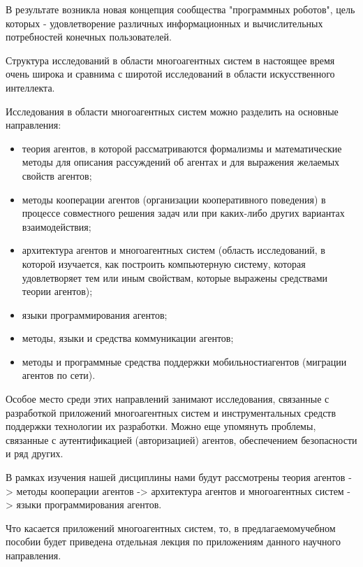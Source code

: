 В результате возникла новая концепция сообщества "программных роботов", цель которых - удовлетворение различных информационных и вычислительных потребностей конечных пользователей.

Структура исследований в области многоагентных систем в настоящее
время очень широка и сравнима с широтой исследований в области искусственного интеллекта.

Исследования в области многоагентных систем можно разделить на основные направления:

\begin{itemize}
  \item теория агентов, в которой рассматриваются формализмы и математические методы для описания рассуждений об агентах и для выражения желаемых свойств агентов;
  \item методы кооперации агентов (организации кооперативного поведения) в
процессе совместного решения задач или при каких-либо других вариантах
взаимодействия;
  \item архитектура агентов и многоагентных систем (область исследований,
в которой изучается, как построить компьютерную систему, которая удовлетворяет тем или иным свойствам, которые выражены средствами теории агентов);
  \item языки программирования агентов;
  \item методы, языки и средства коммуникации агентов;
  \item методы и программные средства поддержки мобильностиагентов
(миграции агентов по сети). 
\end{itemize}

Особое место среди этих направлений занимают исследования, связанные с разработкой приложений многоагентных систем и инструментальных
средств поддержки технологии их разработки. Можно еще упомянуть проблемы, связанные с аутентификацией (авторизацией) агентов, обеспечением
безопасности и ряд других.

В рамках изучения нашей дисциплины нами будут рассмотрены теория
агентов -> методы кооперации агентов -> архитектура агентов и многоагентных систем -> языки программирования агентов.

Что касается приложений многоагентных систем, то, в предлагаемомучебном пособии будет приведена отдельная лекция по приложениям данного
научного направления. 
